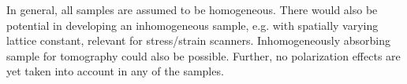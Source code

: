 In general, all samples are assumed to be homogeneous. There would also be
potential in developing an inhomogeneous sample, e.g. with
spatially varying lattice constant, relevant for stress/strain scanners.
Inhomogeneously absorbing sample for tomography could also be possible.
Further, no polarization effects are yet taken into account in any
of the samples.






%

